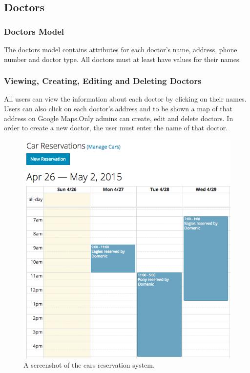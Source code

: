 \documentclass{sig-alternate}
\begin{document}
\subsection{Doctors}

\subsubsection{Doctors Model}
The doctors model contains attributes for each doctor’s name, address, phone number and doctor type. All doctors must at least have values for their names. 

\subsubsection{Viewing, Creating, Editing and Deleting Doctors}
All users can view the information about each doctor by clicking on their names. Users can also click on each doctor’s address and to be shown a map of that address on Google Maps.Only admins can create, edit and delete doctors. In order to create a new doctor, the user must enter the name of that doctor. 

\begin{figure}
\includegraphics[scale=0.4]{Cars}
\caption{A screenshot of the cars reservation system.}
\end{figure}
\end{document}
